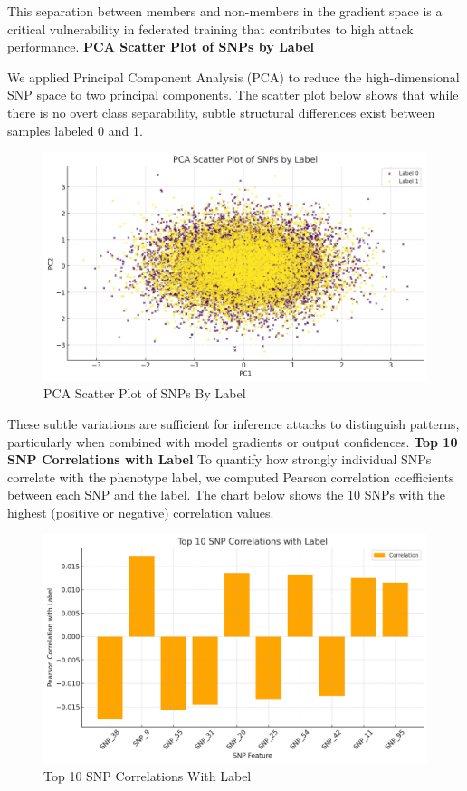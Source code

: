 \documentclass[conference]{IEEEtran}
\begin{document}
This separation between members and non-members in the gradient space is a critical vulnerability in federated training that contributes to high attack performance.
\newline
\newline
\textbf{PCA Scatter Plot of SNPs by Label}

We applied Principal Component Analysis (PCA) to reduce the high-dimensional SNP space to two principal components. The scatter plot below shows that while there is no overt class separability, subtle structural differences exist between samples labeled 0 and 1.

\begin{figure}[H]
    \centering
    \includegraphics[width=\linewidth]{PCAScatter_Plot_Of_SNPs_By_Label.png}
    \caption{PCA Scatter Plot of SNPs By Label}
\end{figure}

These subtle variations are sufficient for inference attacks to distinguish patterns, particularly when combined with model gradients or output confidences.
\newline
\newline
\textbf{Top 10 SNP Correlations with Label}
To quantify how strongly individual SNPs correlate with the phenotype label, we computed Pearson correlation coefficients between each SNP and the label. The chart below shows the 10 SNPs with the highest (positive or negative) correlation values.

\begin{figure}[H]
    \centering
    \includegraphics[width=\linewidth]{Top_10_SNP_Correlations_With_Label.png}
    \caption{Top 10 SNP Correlations With Label}
\end{figure}
\end{document}

